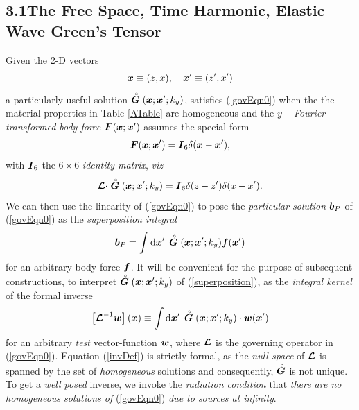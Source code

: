\documentclass[11pt,a4paper]{article}
\newcommand{\CB}[1]{\mbox{\boldmath$\cal #1$\unboldmath}}
\newcommand{\bmi}[1]{\mbox{\boldmath$\mit #1$\unboldmath}}
\newcommand{\rf}[1]{\stackrel{\scriptscriptstyle _{\,\,\circ}}{ #1}}
\begin{document}
\subsection*{3.1\quad The Free Space, Time Harmonic, Elastic Wave Green's Tensor}
Given the 2-D vectors
\[
{\bmi  x}\equiv (z,x), \quad {\bmi  x}^{\prime}\equiv (z^{\prime},x^{\prime})
\]
a particularly useful solution $\rf{\bmi  G }({\bmi  x};{\bmi  x}^{\prime};k_y)$,
satisfies (\ref{govEqn0}) 	when the the material properties in
Table \ref{ATable} are homogeneous and the  {\em $y-$Fourier transformed body
force\/} ${\bmi F}({\bmi x};{\bmi x}^{\prime})$ assumes the
special form
\[
{\bmi F}({\bmi x};{\bmi x}^{\prime})=
{\bmi  I}_6 \delta({\bmi x}-{\bmi x}^{\prime}),
\]
with ${\bmi  I}_6$ the $6 \times 6$ {\em identity matrix\/}, {\em viz\/}
\begin{equation} \label{GreenDef}
{{\CB L}}\cdot \rf{\bmi  G}({\bmi  x};{\bmi  x}^{\prime};k_y)={\bmi  I}_6
\delta({z}-{z}^{\prime})\delta({x}-{x}^{\prime}).
\end{equation}
We can then use the linearity of (\ref{govEqn0}) to pose the {\em
particular solution\/} ${\bmi  b}_{P}$ of (\ref{govEqn0}) as the {\em
superposition integral\/}
\begin{equation}	\label{superposition}
	{\bmi  b}_{P}=\int {\rm d}{\bmi  x}^{\prime}\, \rf{\bmi  G}({\bmi  x};{\bmi
x}^{\prime};k_y){\bmi
	f}({\bmi  x}^{\prime})
\end{equation}
for an arbitrary body force $\bmi  f$.
It will be  convenient for the purpose of subsequent constructions, to
interpret
$\rf{\bmi  G}({\bmi  x};{\bmi  x}^{\prime};k_y)$  of (\ref{superposition}), as the
{\em integral kernel\/} of the formal inverse
\begin{equation}	\label{invDef}
	\left[{{\CB L}}^{-1} {\bmi  w}\right]({\bmi  x})\equiv \int {\rm d}{\bmi
	x}^{\prime}\, \rf{\bmi  G }({\bmi  x};{\bmi  x}^{\prime};k_y)\cdot{\bmi  w}({\bmi
x}^{\prime})
\end{equation}
for an arbitrary {\em test\/} vector-function $\bmi  w$, where ${{\CB L}}$ is the governing
operator in (\ref{govEqn0}). Equation
(\ref{invDef}) is strictly formal,  as the {\em null space\/} of
${{\CB L}}$ is spanned by the set of {\em homogeneous\/} solutions and
consequently,
$\rf{\bmi  G}$ is not unique. To get a {\em well posed\/} inverse, we invoke
the {\em radiation condition\/} that {\em there are no homogeneous
solutions
of\/} (\ref{govEqn0}) {\em due to sources at infinity\/}.
\end{document}
